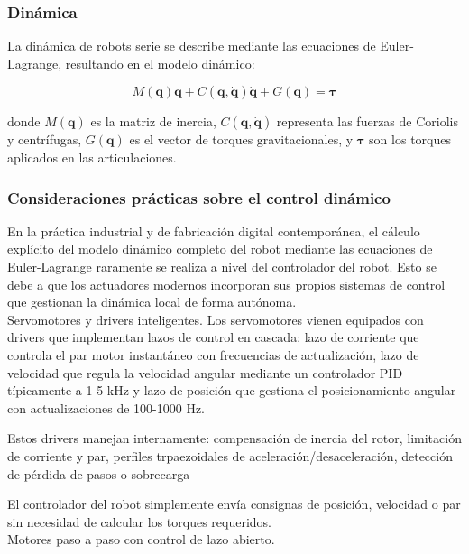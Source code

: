 \subsubsection{Dinámica}

La dinámica de robots serie se describe mediante las ecuaciones de Euler-Lagrange, resultando en el modelo dinámico:

\begin{equation}
M(\mathbf{q})\ddot{\mathbf{q}} + C(\mathbf{q}, \dot{\mathbf{q}})\dot{\mathbf{q}} + G(\mathbf{q}) = \boldsymbol{\tau}
\end{equation}

donde $M(\mathbf{q})$ es la matriz de inercia, $C(\mathbf{q}, \dot{\mathbf{q}})$ representa las fuerzas de Coriolis y centrífugas, $G(\mathbf{q})$ es el vector de torques gravitacionales, y $\boldsymbol{\tau}$ son los torques aplicados en las articulaciones.

\subsubsection{Consideraciones prácticas sobre el control dinámico}

En la práctica industrial y de fabricación digital contemporánea, el cálculo explícito del modelo dinámico completo del robot mediante las ecuaciones de Euler-Lagrange raramente se realiza a nivel del controlador del robot. Esto se debe a que los actuadores modernos incorporan sus propios sistemas de control que gestionan la dinámica local de forma autónoma.\\

Servomotores y drivers inteligentes. 
\noindent
Los servomotores vienen equipados con drivers que implementan lazos de control en cascada: lazo de corriente que controla el par motor instantáneo con frecuencias de actualización, lazo de velocidad que regula la velocidad angular mediante un controlador PID típicamente a 1-5 kHz y lazo de posición que gestiona el posicionamiento angular con actualizaciones de 100-1000 Hz.

Estos drivers manejan internamente: compensación de inercia del rotor, limitación de corriente y par, perfiles trpaezoidales de aceleración/desaceleración, detección de pérdida de pasos o sobrecarga

El controlador del robot simplemente envía consignas de posición, velocidad o par sin necesidad de calcular los torques requeridos.\\

Motores paso a paso con control de lazo abierto.

